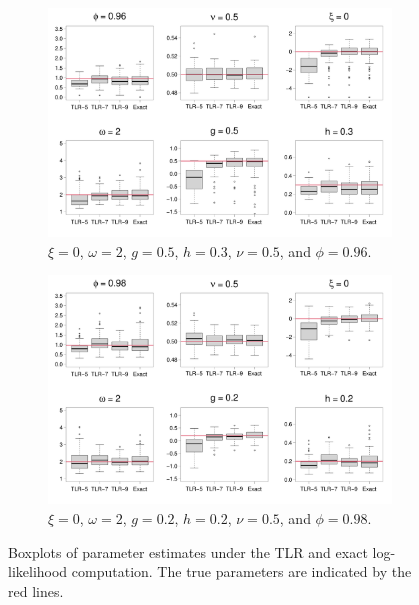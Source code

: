 \documentclass[conference]{IEEEtran}
\begin{document}
\begin{figure}[htp!]
\centering
\begin{subfigure}{0.45\textwidth}%
  \centering
  \includegraphics[width=\linewidth]{./figures/boxplot_0.960000_0.500000_0.300000.pdf}
  \caption{$\xi = 0$, $\omega = 2$, $g = 0.5$, $h = 0.3$, $\nu = 0.5$, and $\phi = 0.96$.}
\end{subfigure}%
\hspace{4mm}
\begin{subfigure}{0.45\textwidth}%
  \centering
  \includegraphics[width=\linewidth]{./figures/boxplot_0.980000_0.200000_0.200000.pdf}
  \caption{  $\xi = 0$, $\omega = 2$, $g = 0.2$, $h = 0.2$, $\nu = 0.5$, and $\phi = 0.98$.}
\end{subfigure}%
\caption{Boxplots of parameter estimates under the TLR and exact log-likelihood computation. The true parameters are indicated by the red lines.}
\label{fig:boxplot}
\end{figure}
\end{document}
